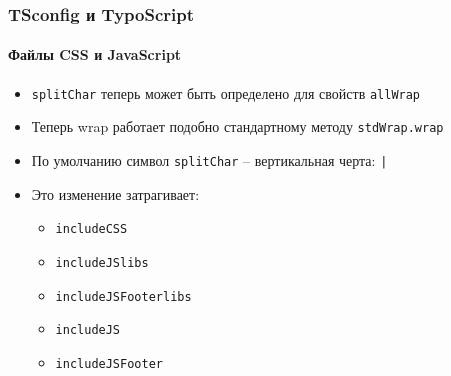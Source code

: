 
\begin{frame}[fragile]
	\frametitle{TSconfig и TypoScript}
	\framesubtitle{Файлы CSS и JavaScript}

	\begin{itemize}
		\item \texttt{splitChar} теперь может быть определено для свойств \texttt{allWrap}
		\item Теперь wrap работает подобно стандартному методу \texttt{stdWrap.wrap}
		\item По умолчанию символ \texttt{splitChar} – вертикальная черта: \texttt{|}
		\item Это изменение затрагивает:

			\begin{itemize}
				\item \texttt{includeCSS}
				\item \texttt{includeJSlibs}
				\item \texttt{includeJSFooterlibs}
				\item \texttt{includeJS}
				\item \texttt{includeJSFooter}
			\end{itemize}

	\end{itemize}

\end{frame}



